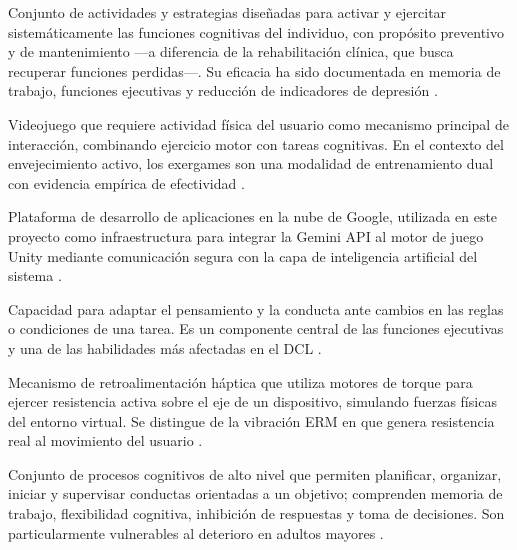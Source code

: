 \begin{description}[leftmargin=0pt, labelwidth=\textwidth, 
                    labelsep=0pt, style=nextline]
\item[\textbf{Estimulación cognitiva (EC)}]
Conjunto de actividades y estrategias diseñadas para activar y ejercitar 
sistemáticamente las funciones cognitivas del individuo, con propósito 
preventivo y de mantenimiento —a diferencia de la rehabilitación clínica, 
que busca recuperar funciones perdidas—. Su eficacia ha sido documentada 
en memoria de trabajo, funciones ejecutivas y reducción de indicadores 
de depresión \parencite{bermejo2021, calatayud2021, arteaga2024}.

\item[\textbf{Exergame}]
Videojuego que requiere actividad física del usuario como mecanismo 
principal de interacción, combinando ejercicio motor con tareas cognitivas. 
En el contexto del envejecimiento activo, los exergames son una modalidad 
de entrenamiento dual con evidencia empírica de efectividad 
\parencite{exergames2026}.

\item[\textbf{Firebase}]
Plataforma de desarrollo de aplicaciones en la nube de Google, utilizada 
en este proyecto como infraestructura para integrar la Gemini API al motor 
de juego Unity mediante comunicación segura con la capa de inteligencia 
artificial del sistema \parencite{Ortega2024}.

\item[\textbf{Flexibilidad cognitiva}]
Capacidad para adaptar el pensamiento y la conducta ante cambios en las 
reglas o condiciones de una tarea. Es un componente central de las 
funciones ejecutivas y una de las habilidades más afectadas en el DCL 
\parencite{AbdAlrazaq2022, Giovagnoli2024}.

\item[\textbf{Force Feedback (FFB)}]
Mecanismo de retroalimentación háptica que utiliza motores de torque para 
ejercer resistencia activa sobre el eje de un dispositivo, simulando 
fuerzas físicas del entorno virtual. Se distingue de la vibración ERM en 
que genera resistencia real al movimiento del usuario 
\parencite{Marchal2008}.

\item[\textbf{Funciones ejecutivas (FE)}]
Conjunto de procesos cognitivos de alto nivel que permiten planificar, 
organizar, iniciar y supervisar conductas orientadas a un objetivo; 
comprenden memoria de trabajo, flexibilidad cognitiva, inhibición de 
respuestas y toma de decisiones. Son particularmente vulnerables al 
deterioro en adultos mayores \parencite{AbdAlrazaq2022}.


\end{description}
